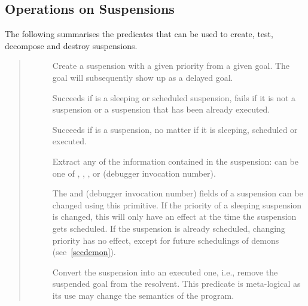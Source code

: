 \subsection{Operations on Suspensions}
The following summarises the predicates that can be used to create, test,
decompose and destroy suspensions.
\begin{quote}
\begin{description}
\item[]
\item[]
Create a suspension with a given priority from a given goal.
The goal will subsequently show up as a delayed goal.

\item[]
Succeeds if  is a sleeping or scheduled suspension,
fails if it is not a suspension or a suspension that has been already executed.

\item[]
Succeeds if  is a suspension, no matter if it is
sleeping, scheduled or executed.

\item[]
Extract any of the information contained in the suspension:
 can be one of
, , ,  or
 (debugger invocation number).


\item[]
The  and  (debugger invocation number) fields
of a suspension can be changed using this primitive.
If the priority of a sleeping suspension is changed,
this will only have an effect at the time the suspension gets
scheduled. If the suspension is already scheduled, changing
priority has no effect, except for future schedulings of demons
(see~\ref{secdemon}).


\item[]
Convert the suspension  into an executed
one, i.e., remove the suspended goal from the resolvent.
This predicate is meta-logical as its use may
change the semantics of the program.
\end{description}
\end{quote}



